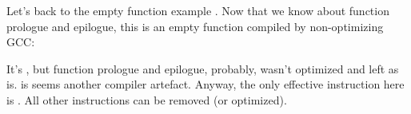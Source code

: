 
Let's back to the empty function example .
Now that we know about function prologue and epilogue,
this is an empty function  compiled by non-optimizing GCC:



It's , but function prologue and epilogue, probably, wasn't optimized and left as is.
 is seems another compiler artefact.
Anyway, the only effective instruction here is .
All other instructions can be removed (or optimized).

